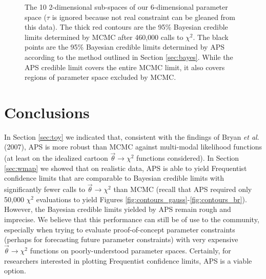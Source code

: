 \documentclass[useAMS,usenatbib]{aastex}
\begin{document}
\begin{figure*}
\caption{
The 10 2-dimensional sub-spaces of our 6-dimensional parameter space
($\tau$ is ignored because not real constraint can be gleaned from this data).
The thick red contours are the 95\% Bayesian credible limits determined by MCMC after
460,000 calls to $\chi^2$.  The black points are the 95\% Bayesian credible limits determined
by APS according to the method outlined in Section \ref{sec:bayes}.  While the APS credible limit
covers the entire MCMC limit, it also covers regions of parameter space excluded by MCMC.
}
\label{fig:contours_bayes}
\end{figure*}

\section{Conclusions}
\label{sec:conclusions}

In Section \ref{sec:toy} we indicated that, consistent with the findings
of Bryan {\it et al}. (2007), APS is more robust
than MCMC against multi-modal likelihood functions (at least on the idealized
cartoon $\vec{\theta}\rightarrow\chi^2$ functions considered).
In Section \ref{sec:wmap} we showed that on realistic data, APS
is able to yield Frequentist confidence limits that are comparable to
Bayesian credible limits with significantly fewer calls to $\vec{\theta}\rightarrow\chi^2$
than MCMC (recall that APS required only 50,000 $\chi^2$ evaluations to yield Figures
\ref{fig:contours_gauss}-\ref{fig:contours_br}).  However, the Bayesian credible
limits yielded by APS remain rough and imprecise.  We believe that this performance
can still be of use to the community, especially when trying to evaluate proof-of-concept
parameter constraints (perhaps for forecasting future parameter constraints)
with very expensive $\vec{\theta}\rightarrow\chi^2$ functions on poorly-understood
parameter spaces.  Certainly, for researchers interested in plotting Frequentist confidence limits,
APS is a viable option.
\end{document}
